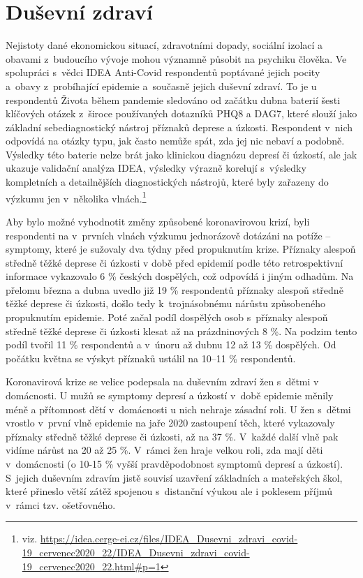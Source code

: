 \section*{Duševní zdraví}
\label{Dusevni_zdravi}

Nejistoty dané ekonomickou situací, zdravotními dopady, sociální izolací a obavami z budoucího vývoje mohou významně působit na psychiku člověka. Ve spolupráci s vědci IDEA Anti-Covid respondentů poptávané jejich pocity a obavy z probíhající epidemie a současně jejich duševní zdraví. To je u respondentů Života během pandemie sledováno od začátku dubna baterií šesti klíčových otázek z široce používaných dotazníků PHQ8 a DAG7, které slouží jako základní sebediagnostický nástroj příznaků deprese a úzkosti. Respondent v nich odpovídá na otázky typu, jak často nemůže spát, zda jej nic nebaví a podobně. Výsledky této baterie nelze brát jako klinickou diagnózu depresí či úzkostí, ale jak ukazuje validační analýza IDEA, výsledky výrazně korelují s výsledky kompletních a detailnějších diagnostických nástrojů, které byly zařazeny do výzkumu jen v několika vlnách.\footnote{viz.
\url{https://idea.cerge-ei.cz/files/IDEA\_Dusevni\_zdravi\_covid-19\_cervenec2020\_22/IDEA\_Dusevni\_zdravi\_covid-19\_cervenec2020\_22.html\#p=1}}

Aby bylo možné vyhodnotit změny způsobené koronavirovou krizí, byli respondenti na v prvních vlnách výzkumu jednorázově dotázáni na potíže – symptomy, které je sužovaly dva týdny před propuknutím krize. Příznaky alespoň středně těžké deprese či úzkosti v době před epidemií podle této retrospektivní informace vykazovalo 6 \% českých dospělých, což odpovídá i jiným odhadům. Na přelomu března a dubna uvedlo již 19 \% respondentů příznaky alespoň středně těžké deprese či úzkosti, došlo tedy k trojnásobnému nárůstu způsobeného propuknutím epidemie. Poté začal podíl dospělých osob s příznaky alespoň středně těžké deprese či úzkosti klesat až na prázdninových 8 \%. Na podzim tento podíl tvořil 11 \% respondentů a v únoru až dubnu 12 až 13 \% dospělých. Od počátku května se výskyt příznaků ustálil na 10–11 \% respondentů.

Koronavirová krize se velice podepsala na duševním zdraví žen s dětmi v domácnosti. U mužů se symptomy depresí a úzkostí v době epidemie měnily méně a přítomnost dětí v domácnosti u nich nehraje zásadní roli. U žen s dětmi vrostlo v první vlně epidemie na jaře 2020 zastoupení těch, které vykazovaly příznaky středně těžké deprese či úzkosti, až na 37 \%. V každé další vlně pak vidíme nárůst na 20 až 25 \%. V rámci žen hraje velkou roli, zda mají děti v domácnosti (o 10-15 \% vyšší pravděpodobnost symptomů depresí a úzkostí). S jejich duševním zdravím jistě souvisí uzavření základních a mateřských škol, které přineslo větší zátěž spojenou s distanční výukou ale i poklesem příjmů v rámci tzv. ošetřovného.

